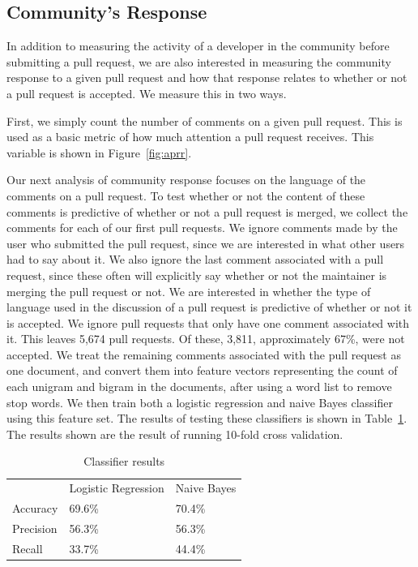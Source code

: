 \documentclass{sigchi}
\begin{document}
\subsection{Community's Response} In addition to measuring the activity of a
developer in the community before submitting a pull request, we are also
interested in measuring the community response to a given pull request and how
that response relates to whether or not a pull request is accepted. We measure
this in two ways.

First, we simply count the number of comments on a given pull request. This is
used as a basic metric of how much attention a pull request receives. This
variable is shown in Figure~\ref{fig:aprr}.

Our next analysis of community response focuses on the language of the comments
on a pull request. To test whether or not the content of these comments is
predictive of whether or not a pull request is merged, we collect the comments
for each of our first pull requests. We ignore comments made by the user who
submitted the pull request, since we are interested in what other users had to
say about it. We also ignore the last comment associated with a pull request,
since these often will explicitly say whether or not the maintainer is merging
the pull request or not. We are interested in whether the type of language used
in the discussion of a pull request is predictive of whether or not it is
accepted. We ignore pull requests that only have one comment associated with it.
This leaves 5,674 pull requests. Of these, 3,811, approximately 67\%, were not
accepted. We treat the remaining comments associated with the pull request as
one document, and convert them into feature vectors representing the count of
each unigram and bigram in the documents, after using a word list to remove stop
words. We then train both a logistic regression and naive Bayes classifier using
this feature set. The results of testing these classifiers is shown in
Table~\ref{tbl:classifiers}. The results shown are the result of running 10-fold
cross validation.

\begin{table}[ht] \centering
  \caption{Classifier results}
  \label{tbl:classifiers}
  \begin{tabular}{lll}
  \hline\hline
  ~         & Logistic Regression & Naive Bayes \\
  Accuracy  & 69.6\%              & 70.4\%      \\
  Precision & 56.3\%              & 56.3\%      \\
  Recall    & 33.7\%              & 44.4\%      \\
  \hline
  \end{tabular}
\end{table}
\end{document}
